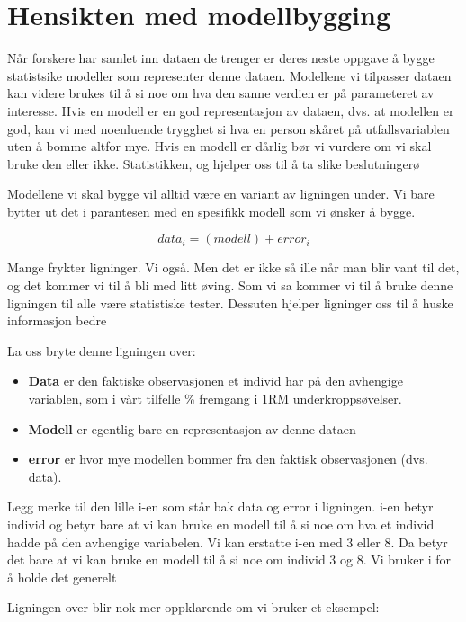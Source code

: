 \documentclass[
]{book}
\begin{document}
\hypertarget{hensikten-med-modellbygging}{%
\section{Hensikten med modellbygging}\label{hensikten-med-modellbygging}}

Når forskere har samlet inn dataen de trenger er deres neste oppgave å bygge statistsike modeller som representer denne dataen. Modellene vi tilpasser dataen kan videre brukes til å si noe om hva den sanne verdien er på parameteret av interesse. Hvis en modell er en god representasjon av dataen, dvs. at modellen er god, kan vi med noenluende trygghet si hva en person skåret på utfallsvariablen uten å bomme altfor mye. Hvis en modell er dårlig bør vi vurdere om vi skal bruke den eller ikke. Statistikken, og hjelper oss til å ta slike beslutningerø

Modellene vi skal bygge vil alltid være en variant av ligningen under. Vi bare bytter ut det i parantesen med en spesifikk modell som vi ønsker å bygge.

\[
data_i = (modell) + error_i
\]

Mange frykter ligninger. Vi også. Men det er ikke så ille når man blir vant til det, og det kommer vi til å bli med litt øving. Som vi sa kommer vi til å bruke denne ligningen til alle være statistiske tester. Dessuten hjelper ligninger oss til å huske informasjon bedre

La oss bryte denne ligningen over:

\begin{itemize}
\item
  \textbf{Data} er den faktiske observasjonen et individ har på den avhengige variablen, som i vårt tilfelle \% fremgang i 1RM underkroppsøvelser.
\item
  \textbf{Modell} er egentlig bare en representasjon av denne dataen-
\item
  \textbf{error} er hvor mye modellen bommer fra den faktisk observasjonen (dvs. data).
\end{itemize}

Legg merke til den lille i-en som står bak data og error i ligningen. i-en betyr individ og betyr bare at vi kan bruke en modell til å si noe om hva et individ hadde på den avhengige variabelen. Vi kan erstatte i-en med 3 eller 8. Da betyr det bare at vi kan bruke en modell til å si noe om individ 3 og 8. Vi bruker i for å holde det generelt

Ligningen over blir nok mer oppklarende om vi bruker et eksempel:
\end{document}
